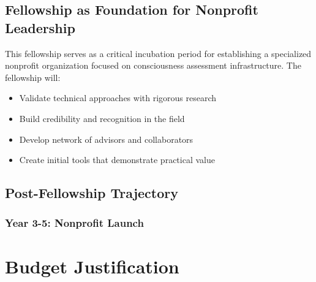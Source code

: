 \documentclass[11pt,a4paper]{article}
\begin{document}


\subsection{Fellowship as Foundation for Nonprofit Leadership}

This fellowship serves as a critical incubation period for establishing a specialized nonprofit organization focused on consciousness assessment infrastructure. The fellowship will:

\begin{itemize}
    \item Validate technical approaches with rigorous research
    \item Build credibility and recognition in the field
    \item Develop network of advisors and collaborators
    \item Create initial tools that demonstrate practical value
\end{itemize}

\subsection{Post-Fellowship Trajectory}

\subsubsection{Year 3-5: Nonprofit Launch}

\section{Budget Justification}
\label{sec:budget}

\end{document}
